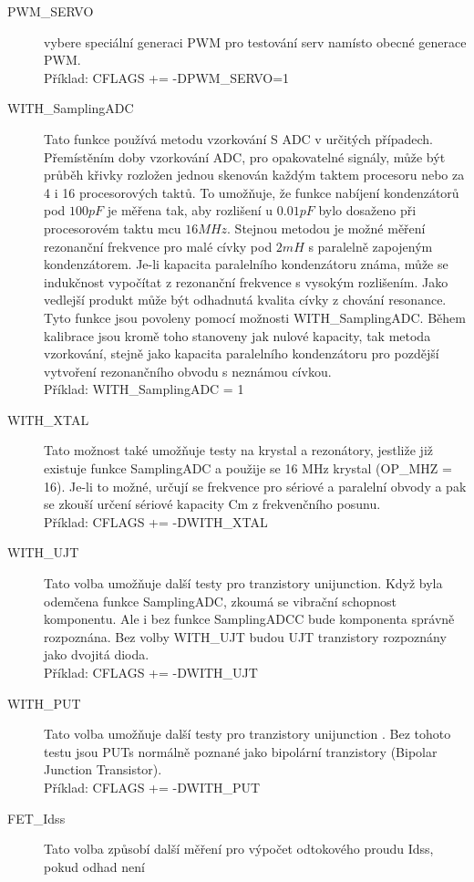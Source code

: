 \begin{description}
\item[PWM\_SERVO] 
vybere speciální generaci PWM pro testování serv namísto obecné generace PWM.\\
Příklad: CFLAGS += -DPWM\_SERVO=1
  \item[WITH\_SamplingADC] Tato funkce používá metodu vzorkování S ADC v určitých případech.
Přemístěním doby vzorkování ADC, pro opakovatelné signály, může být průběh křivky rozložen jednou
skenován každým taktem procesoru nebo za 4 i 16 procesorových taktů.
To umožňuje, že funkce nabíjení kondenzátorů pod \(100pF\) je měřena tak,
aby rozlišení u \(0.01pF\) bylo dosaženo při procesorovém taktu mcu \(16MHz\).
Stejnou metodou je možné měření rezonanční frekvence pro malé cívky pod \(2mH\) s paralelně
zapojeným kondenzátorem.
Je-li kapacita paralelního kondenzátoru známa, může se indukčnost vypočítat z rezonanční
frekvence s vysokým rozlišením.
Jako vedlejší produkt může být odhadnutá kvalita cívky z chování resonance.
Tyto funkce jsou povoleny pomocí možnosti WITH\_SamplingADC.
Během kalibrace jsou kromě toho stanoveny jak nulové kapacity, tak metoda vzorkování,
stejně jako kapacita paralelního kondenzátoru pro pozdější vytvoření rezonančního obvodu s neznámou cívkou.\\
Příklad: WITH\_SamplingADC = 1
  \item[WITH\_XTAL]
Tato možnost také umožňuje testy na krystal a rezonátory, jestliže již existuje funkce SamplingADC
a použije se 16 MHz krystal (OP\_MHZ = 16).
Je-li to možné, určují se frekvence pro sériové a paralelní obvody a pak se zkouší
určení sériové kapacity Cm z frekvenčního posunu.\\
Příklad: CFLAGS += -DWITH\_XTAL
  \item[WITH\_UJT]
Tato volba umožňuje další testy pro tranzistory unijunction.
Když byla odemčena funkce SamplingADC, zkoumá se vibrační schopnost komponentu.
Ale i bez funkce SamplingADCC bude komponenta správně rozpoznána.
Bez volby WITH\_UJT budou UJT tranzistory rozpoznány jako dvojitá dioda.\\
Příklad: CFLAGS += -DWITH\_UJT
  \item[WITH\_PUT]
	  Tato volba umožňuje další testy pro tranzistory unijunction .
Bez tohoto testu jsou PUTs normálně poznané jako bipolární tranzistory (Bipolar Junction Transistor).\\
Příklad: CFLAGS += -DWITH\_PUT
 \item[FET\_Idss]
Tato volba způsobí další měření pro výpočet odtokového proudu Idss, pokud odhad není

\end{description}
